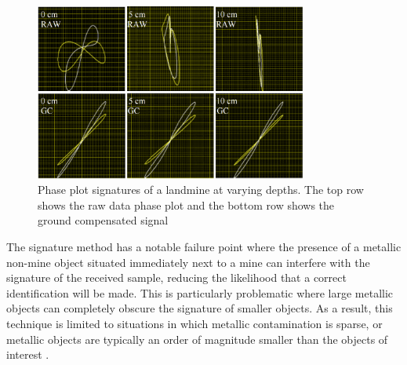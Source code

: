\documentclass[main.tex]{subfiles}
\begin{document}
\begin{figure}[ht]
\includegraphics[width=0.8\textwidth]{3-LiteratureReview/compensated-signature.png}
\centering
\caption[Phase plot signatures of a landmine at varying depths. The top row shows the raw data phase plot and the bottom row shows the ground compensated signal]{Phase plot signatures of a landmine at varying depths. The top row shows the raw data phase plot and the bottom row shows the ground compensated signal \parencite{Kruger2006}} 
\end{figure}
The signature method has a notable failure point where the presence of a metallic non-mine object situated immediately next to a mine can interfere with the signature of the received sample, reducing the likelihood that a correct identification will be made. This is particularly problematic where large metallic objects can completely obscure the signature of smaller objects. As a result, this technique is limited to situations in which metallic contamination is sparse, or metallic objects are typically an order of magnitude smaller than the objects of interest \parencite{Kruger2006}.
\end{document}
